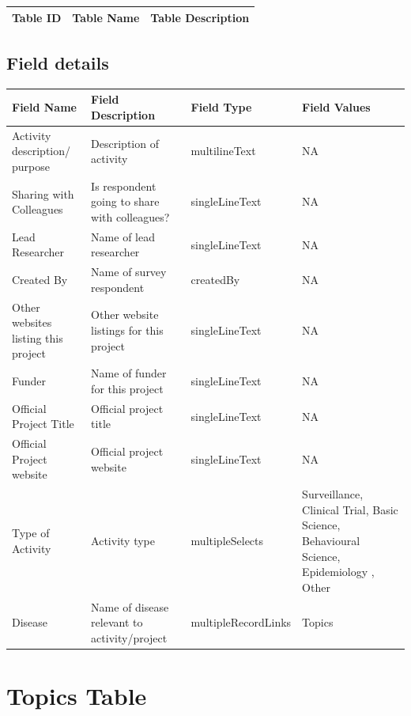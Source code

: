 \documentclass[
]{book}
\begin{document}
\begin{table}
\centering
\begin{tabular}{l|l|l}
\hline
\textbf{Table ID} & \textbf{Table Name} & \textbf{Table Description}\\


\hline
\end{tabular}
\end{table}

\hypertarget{field-details-5}{%
\subsection{Field details}\label{field-details-5}}

\begin{table}
\centering
\begin{tabular}{l|l|l|l}
\hline
\textbf{Field Name} & \textbf{Field Description} & \textbf{Field Type} & \textbf{Field Values}\\
\hline
Activity description/ purpose & Description of activity & multilineText & NA\\
\hline
Sharing with Colleagues & Is respondent going to share with colleagues? & singleLineText & NA\\
\hline
Lead Researcher & Name of lead researcher & singleLineText & NA\\
\hline
Created By & Name of survey respondent & createdBy & NA\\
\hline
Other websites listing this project & Other website listings for this project & singleLineText & NA\\
\hline
Funder & Name of funder for this project & singleLineText & NA\\
\hline
Official Project Title & Official project title & singleLineText & NA\\
\hline
Official Project website & Official project website & singleLineText & NA\\
\hline
Type of Activity & Activity type & multipleSelects & Surveillance, Clinical Trial, Basic Science, Behavioural Science, Epidemiology , Other\\
\hline
Disease & Name of disease relevant to activity/project & multipleRecordLinks & Topics\\
\hline
\end{tabular}
\end{table}

\hypertarget{topics-table}{%
\section{Topics Table}\label{topics-table}}
\end{document}
